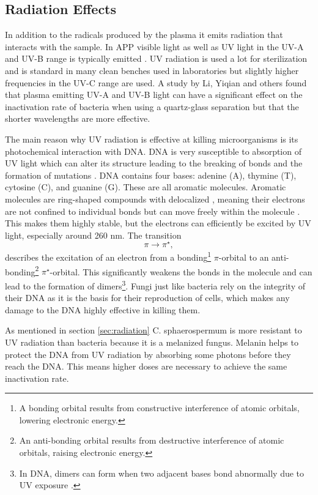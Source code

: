 \subsection{Radiation Effects}
In addition to the radicals produced by the plasma it emits radiation that interacts with the sample. In APP visible light as well as UV light in the UV-A and UV-B range is typically emitted \cite{plasma2}. UV radiation is used a lot for sterilization and is standard in many clean benches used in laboratories but slightly higher frequencies in the UV-C range are used. A study by Li, Yiqian and others \cite{bacteria} found that plasma emitting UV-A and UV-B light can have a significant effect on the inactivation rate of bacteria when using a quartz-glass separation but that the shorter wavelengths are more effective.

The main reason why UV radiation is effective at killing microorganisms is its photochemical interaction with DNA. DNA is very susceptible to absorption of UV light which can alter its structure leading to the breaking of bonds and the formation of mutations \cite{DNA}. DNA contains four bases: adenine (A), thymine (T), cytosine (C), and guanine (G). These are all aromatic molecules. Aromatic molecules are ring-shaped compounds with delocalized , meaning their electrons are not confined to individual bonds but can move freely within the molecule \cite{DNA}. This makes them highly stable, but the electrons can efficiently  be excited by  UV light, especially around 260 nm. The transition \begin{equation}
    \pi \rightarrow \pi ^\star,
\end{equation}
describes the excitation of an electron from a bonding\footnote{A bonding orbital results from constructive interference of atomic orbitals, lowering electronic energy.} $\pi$-orbital to an anti-bonding\footnote{An anti-bonding orbital results from destructive interference of atomic orbitals, raising electronic energy.}  $\pi^\star$-orbital. This significantly weakens the bonds in the molecule and can lead to the formation of dimers\footnote{In DNA, dimers can form when two adjacent bases bond abnormally due to UV exposure \cite{DNA}.}. Fungi just like bacteria rely on the integrity of their DNA as it is the basis for their reproduction of cells, which makes any damage to the DNA highly effective in killing them.

As mentioned in section \ref{sec:radiation} C. sphaerospermum is more resistant to UV radiation than bacteria because it is a melanized fungus. Melanin helps to protect the DNA from UV radiation by absorbing some photons before they reach the DNA. This means higher doses are necessary to achieve the same inactivation rate.